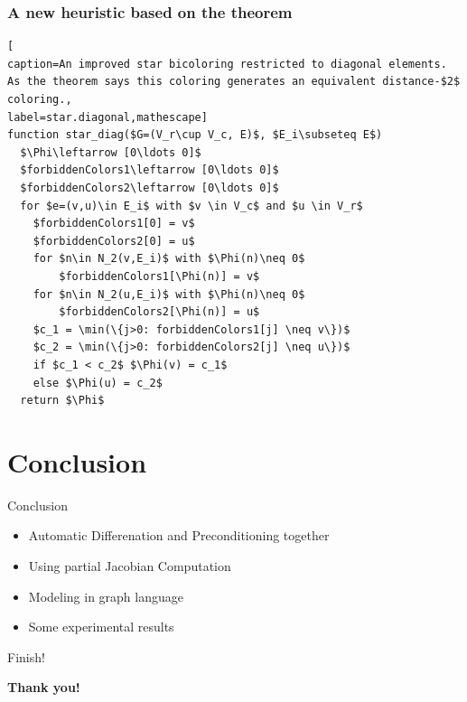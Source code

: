\documentclass{beamer}
\begin{document}
\begin{frame}[fragile]
\frametitle{A new heuristic based on the theorem}
\begin{lstlisting}[
caption=An improved star bicoloring restricted to diagonal elements.
As the theorem says this coloring generates an equivalent distance-$2$ coloring.,
label=star.diagonal,mathescape]
function star_diag($G=(V_r\cup V_c, E)$, $E_i\subseteq E$)
  $\Phi\leftarrow [0\ldots 0]$
  $forbiddenColors1\leftarrow [0\ldots 0]$
  $forbiddenColors2\leftarrow [0\ldots 0]$
  for $e=(v,u)\in E_i$ with $v \in V_c$ and $u \in V_r$
    $forbiddenColors1[0] = v$
    $forbiddenColors2[0] = u$
    for $n\in N_2(v,E_i)$ with $\Phi(n)\neq 0$
        $forbiddenColors1[\Phi(n)] = v$
    for $n\in N_2(u,E_i)$ with $\Phi(n)\neq 0$
        $forbiddenColors2[\Phi(n)] = u$
    $c_1 = \min(\{j>0: forbiddenColors1[j] \neq v\})$
    $c_2 = \min(\{j>0: forbiddenColors2[j] \neq u\})$
    if $c_1 < c_2$ $\Phi(v) = c_1$
    else $\Phi(u) = c_2$
  return $\Phi$
\end{lstlisting}
\end{frame}

\section{Conclusion}
\begin{frame}{Conclusion}
\begin{itemize}
\item Automatic Differenation and Preconditioning together
\item Using partial Jacobian Computation
\item Modeling in graph language
\item Some experimental results
\end{itemize}
\end{frame}

\begin{frame}{Finish!}
\begin{center}
   \Huge \bf Thank you!
\end{center}
\end{frame}
\end{document}
